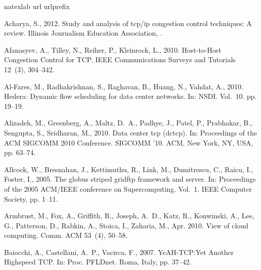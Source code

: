 \documentclass[preprint,3p,times,twocolumn,authoryear]{elsarticle}
\begin{document}
\begin{thebibliography}{46}
\expandafter\ifx\csname natexlab\endcsname\relax\def\natexlab#1{#1}\fi
\expandafter\ifx\csname url\endcsname\relax
  \def\url#1{\texttt{#1}}\fi
\expandafter\ifx\csname urlprefix\endcsname\relax\def\urlprefix{URL }\fi

Acharya, S., 2012. Study and analysis of tcp/ip congestion control techniques:
  A review. Illinois Journalism Education Association, .

Afanasyev, A., Tilley, N., Reiher, P., Kleinrock, L., 2010. {Host-to-Host
  Congestion Control for TCP}. IEEE Communications Surveys and Tutorials
  12~(3), 304--342.

Al-Fares, M., Radhakrishnan, S., Raghavan, B., Huang, N., Vahdat, A., 2010.
  Hedera: Dynamic flow scheduling for data center networks. In: NSDI. Vol.~10.
  pp. 19--19.

Alizadeh, M., Greenberg, A., Maltz, D.~A., Padhye, J., Patel, P., Prabhakar,
  B., Sengupta, S., Sridharan, M., 2010. Data center tcp (dctcp). In:
  Proceedings of the ACM SIGCOMM 2010 Conference. SIGCOMM '10. ACM, New York,
  NY, USA, pp. 63--74.

Allcock, W., Bresnahan, J., Kettimuthu, R., Link, M., Dumitrescu, C., Raicu,
  I., Foster, I., 2005. The globus striped gridftp framework and server. In:
  Proceedings of the 2005 ACM/IEEE conference on Supercomputing. Vol.~1. IEEE
  Computer Society, pp. 1--11.

Armbrust, M., Fox, A., Griffith, R., Joseph, A.~D., Katz, R., Konwinski, A.,
  Lee, G., Patterson, D., Rabkin, A., Stoica, I., Zaharia, M., Apr. 2010. View
  of cloud computing. Comm. ACM 53~(4), 50--58.

Baiocchi, A., Castellani, A.~P., Vacirca, F., 2007. {YeAH-TCP:Yet Another
  Highspeed TCP}. In: Proc. PFLDnet. Roma, Italy, pp. 37--42.


\end{thebibliography}
\end{document}
